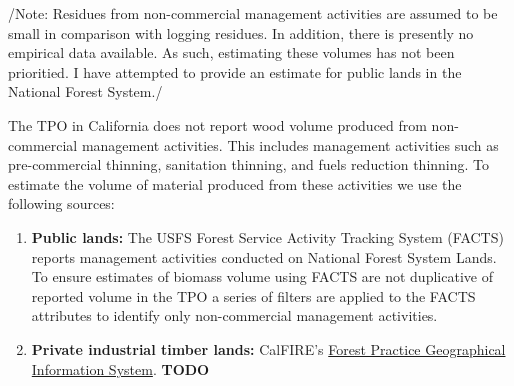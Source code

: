 \documentclass[a4paper]{article}
\begin{document}
/Note: Residues from non-commercial management activities are assumed to
be small in comparison with logging residues. In addition, there is
presently no empirical data available. As such, estimating these volumes
has not been prioritied. I have attempted to provide an estimate for
public lands in the National Forest System./

The TPO in California does not report wood volume produced from
non-commercial management activities. This includes management
activities such as pre-commercial thinning, sanitation thinning, and
fuels reduction thinning. To estimate the volume of material produced
from these activities we use the following sources:

\begin{enumerate}
\item \textbf{Public lands:} The USFS Forest Service Activity Tracking System
(FACTS) reports management activities conducted on National Forest
System Lands. To ensure estimates of biomass volume using FACTS are
not duplicative of reported volume in the TPO a series of filters are
applied to the FACTS attributes to identify only non-commercial
management activities.
\item \textbf{Private industrial timber lands:} CalFIRE's
\href{http://www.calfire.ca.gov/resource_mgt/resource_mgt_forestpractice_gis}{Forest
Practice Geographical Information System}. \textbf{TODO}
\end{enumerate}
\end{document}
